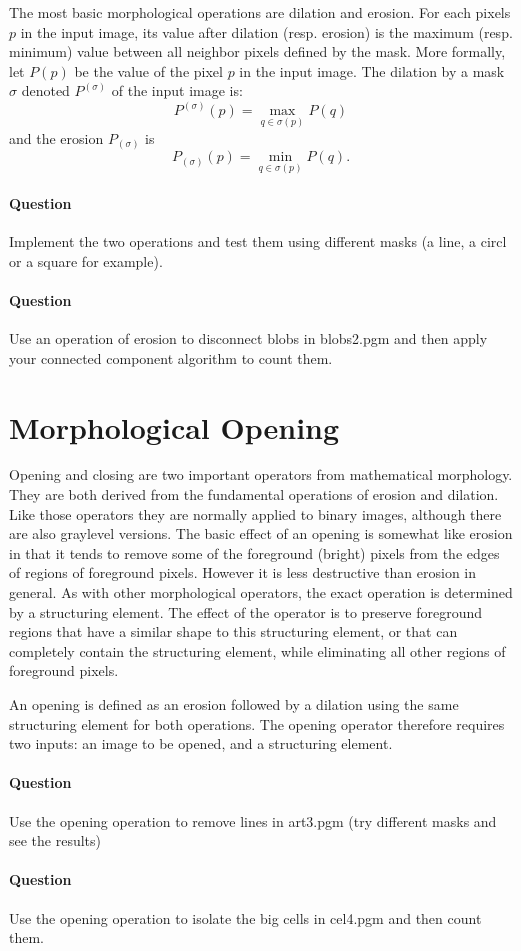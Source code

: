 \documentclass[a4paper, 11pt]{article}
\begin{document}
The most basic morphological operations are dilation and erosion. 
For each pixels $p$ in the input image, its value after dilation (resp. erosion) is the maximum (resp. minimum) value between all neighbor pixels defined by the mask.
More formally, let $P(p)$ be the value of the pixel $p$ in the input image. The dilation by a mask $\sigma$ denoted $P^{(\sigma)}$ of the input image is:
\[
  P^{(\sigma)}(p) = \max_{q\in\sigma(p)} P(q)
\]
and the erosion $P_{(\sigma)}$ is
\[
  P_{(\sigma)}(p) = \min_{q\in\sigma(p)} P(q).
\]

\paragraph{Question} Implement the two operations and test them using different masks (a line, a circl or a square for example).

\paragraph{Question} Use an operation of erosion to disconnect blobs in blobs2.pgm and then apply your connected component algorithm to count them.

\section*{\bf Morphological Opening}

Opening and closing are two important operators from mathematical morphology. 
They are both derived from the fundamental operations of erosion and dilation. 
Like those operators they are normally applied to binary images, although there are also graylevel versions. 
The basic effect of an opening is somewhat like erosion in that it tends to remove some of the foreground (bright) pixels from the edges of regions of foreground pixels. 
However it is less destructive than erosion in general. As with other morphological operators, the exact operation is determined by a structuring element. 
The effect of the operator is to preserve foreground regions that have a similar shape to this structuring element, or that can completely contain the structuring element, 
while eliminating all other regions of foreground pixels.

An opening is defined as an erosion followed by a dilation using the same structuring element for both operations.
The opening operator therefore requires two inputs: an image to be opened, and a structuring element.

\paragraph{Question} Use the opening operation to remove lines in art3.pgm (try different masks and see the results)

\paragraph{Question} Use the opening operation to isolate the big cells in cel4.pgm and then count them.
\end{document}

